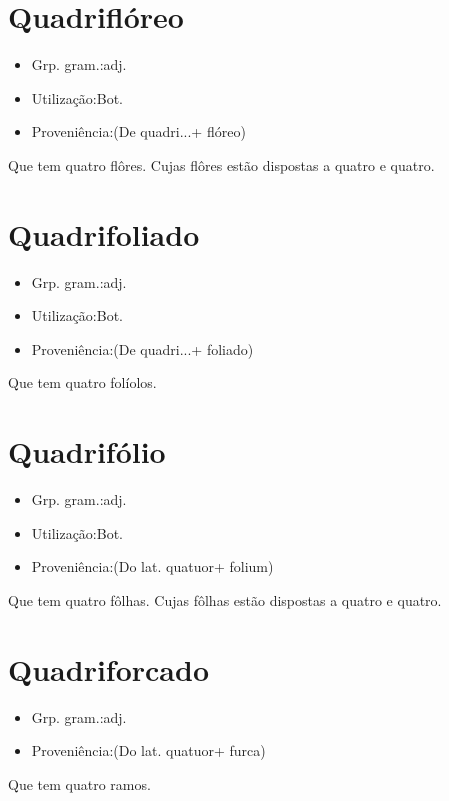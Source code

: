 \section{Quadriflóreo}
\begin{itemize}
\item {Grp. gram.:adj.}
\end{itemize}
\begin{itemize}
\item {Utilização:Bot.}
\end{itemize}
\begin{itemize}
\item {Proveniência:(De \textunderscore quadri...\textunderscore  + \textunderscore flóreo\textunderscore )}
\end{itemize}
Que tem quatro flôres.
Cujas flôres estão dispostas a quatro e quatro.
\section{Quadrifoliado}
\begin{itemize}
\item {Grp. gram.:adj.}
\end{itemize}
\begin{itemize}
\item {Utilização:Bot.}
\end{itemize}
\begin{itemize}
\item {Proveniência:(De \textunderscore quadri...\textunderscore  + \textunderscore foliado\textunderscore )}
\end{itemize}
Que tem quatro folíolos.
\section{Quadrifólio}
\begin{itemize}
\item {Grp. gram.:adj.}
\end{itemize}
\begin{itemize}
\item {Utilização:Bot.}
\end{itemize}
\begin{itemize}
\item {Proveniência:(Do lat. \textunderscore quatuor\textunderscore  + \textunderscore folium\textunderscore )}
\end{itemize}
Que tem quatro fôlhas.
Cujas fôlhas estão dispostas a quatro e quatro.
\section{Quadriforcado}
\begin{itemize}
\item {Grp. gram.:adj.}
\end{itemize}
\begin{itemize}
\item {Proveniência:(Do lat. \textunderscore quatuor\textunderscore  + \textunderscore furca\textunderscore )}
\end{itemize}
Que tem quatro ramos.
